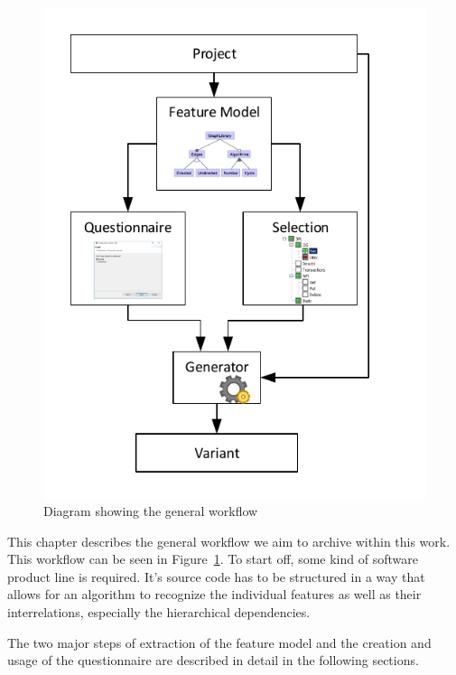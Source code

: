 \begin{figure}
	\includegraphics{img/img-workflow.pdf}
	\caption{Diagram showing the general workflow}
	\label{img-workflow}
\end{figure}

This chapter describes the general workflow we aim to archive within this work. This workflow can be seen in Figure~\ref{img-workflow}. To start off, some kind of software product line is required. It's source code has to be structured in a way that allows for an algorithm to recognize the individual features as well as their interrelations, especially the hierarchical dependencies.


The two major steps of extraction of the feature model and the creation and usage of the questionnaire are described in detail in the following sections.


